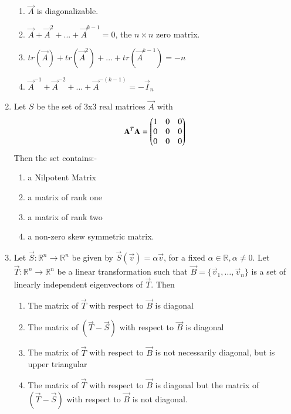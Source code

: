 \begin{enumerate}[label=\thesection.\arabic*.,ref=\thesection.\theenumi]
	\begin{enumerate}
		\item $\vec{A}$ is diagonalizable. \\
		\item $\vec{A}+\Vec{A}^2+...+\vec{A}^{k-1} = 0$, the $n\times n$ zero matrix. \\
		\item $tr(\vec{A})+tr(\Vec{A}^2)+...+tr(\vec{A}^{k-1}) = -n$ \\
		\item $\vec{A}^{-1}+\Vec{A}^{-2}+...+\vec{A}^{-(k-1)} = -\vec{I}_n$
	\end{enumerate}
%
%
\solution

\item Let $S$ be the set of 3x3 real matrices $\vec{A}$ with 
\begin{align}
    \mathbf{A}^T\mathbf{A}=\begin{pmatrix}1&0&0\\0&0&0\\0&0&0\end{pmatrix}
\end{align}
Then the set contains:-\\
\begin{enumerate}
    \item a Nilpotent Matrix
    \item a matrix of rank one
    \item a matrix of rank two
    \item a non-zero skew symmetric matrix.
\end{enumerate}
%
%
\solution

\item Let $\vec{S}: \mathbb R^n \rightarrow \mathbb R^n$ be given by $\vec{S}(\vec{v}) = \alpha\vec{v}$, for a fixed $\alpha \in \mathbb R, \alpha \neq 0$. Let $\vec{T}: \mathbb R^n \rightarrow \mathbb R^n$ be a linear transformation such that $\vec{B} = \{ \vec{v}_1,\ldots,\vec{v}_n \}$ is a set of linearly independent eigenvectors of $\vec{T}$. Then
\begin{enumerate}
    \item The matrix of $\vec{T}$ with respect to $\vec{B}$ is diagonal
    \item The matrix of $(\vec{T}-\vec{S})$ with respect to $\vec{B}$ is diagonal
    \item The matrix of $\vec{T}$ with respect to $\vec{B}$ is not necessarily diagonal, but is upper triangular
    \item The matrix of $\vec{T}$ with respect to $\vec{B}$ is diagonal but the matrix of $(\vec{T}-\vec{S})$ with respect to $\vec{B}$ is not diagonal.
\end{enumerate}
%
\solution



\end{enumerate}
